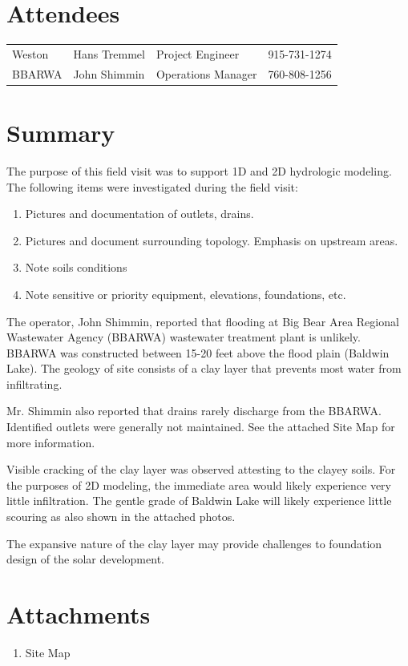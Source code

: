 \documentclass{article}
\begin{document}
\section*{Attendees}
\begin{table}[h]
  \label{tab:label}
  \begin{tabular}{l l l l}
      Weston & Hans Tremmel & Project Engineer & 915-731-1274 \\
      BBARWA & John Shimmin & Operations Manager & 760-808-1256\\
  \end{tabular}
\end{table}

\section*{Summary}
The purpose of this field visit was to support 1D and 2D hydrologic modeling.  The following items were investigated during the field visit:
\begin{enumerate}[noitemsep]
    \item Pictures and documentation of outlets, drains.
    \item Pictures and document surrounding topology.  Emphasis on upstream areas.
    \item Note soils conditions
    \item Note sensitive or priority equipment, elevations, foundations, etc.
\end{enumerate}

The operator, John Shimmin, reported that flooding at Big Bear Area Regional Wastewater Agency (BBARWA) wastewater treatment plant is unlikely.  BBARWA was constructed between 15-20 feet above the flood plain (Baldwin Lake). The geology of site consists of a clay layer that prevents most water from infiltrating.

Mr. Shimmin also reported that drains rarely discharge from the BBARWA.  Identified outlets were generally not maintained.  See the attached Site Map for more information.

Visible cracking of the clay layer was observed attesting to the clayey soils.  For the purposes of 2D modeling, the immediate area would likely experience very little infiltration.  The gentle grade of Baldwin Lake will likely experience little scouring as also shown in the attached photos.

The expansive nature of the clay layer may provide challenges to foundation design of the solar development.

\section*{Attachments}
\begin{enumerate}[noitemsep]
    \item Site Map
\end{enumerate}




\end{document}
